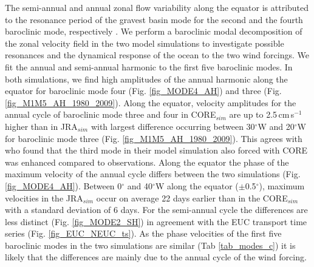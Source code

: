 \documentclass[os, manuscript]{copernicus}
\begin{document}
	The semi-annual and annual zonal flow variability along the equator is attributed to the resonance period of the gravest basin mode for the second and the fourth baroclinic mode, respectively \citep{Brandt2016}. We perform a baroclinic modal decomposition of the zonal velocity field in the two model simulations to investigate possible resonances and the dynamical response of the ocean to the two wind forcings. We fit the annual and semi-annual harmonic to the first five baroclinic modes. In both simulations, we find high amplitudes of the annual harmonic along the equator for baroclinic mode four (Fig. \ref{fig_MODE4_AH}) and three (Fig. \ref{fig_M1M5_AH_1980_2009}). Along the equator, velocity amplitudes for the annual cycle of baroclinic mode three and four in CORE$_{sim}$ are up to 2.5$\,$cm$\,$s$^{-1}$ higher than in JRA$_{sim}$ with largest difference occurring between 30$^{\circ}$W and 20$^{\circ}$W for baroclinic mode three (Fig. \ref{fig_M1M5_AH_1980_2009}). This agrees with \cite{Brandt2016} who found that the third mode in their model simulation also forced with CORE was enhanced compared to observations. 
	Along the equator the phase of the maximum velocity of the annual cycle differs between the two simulations (Fig. \ref{fig_MODE4_AH}). Between 0$^{\circ}$ and 40$^{\circ}$W along the equator ($ \pm $0.5$^{\circ}$), maximum velocities in the JRA$_{sim}$ occur on average 22 days earlier than in the CORE$_{sim}$ with a standard deviation of 6 days. For the semi-annual cycle the differences are less distinct (Fig. \ref{fig_MODE2_SH}) in agreement with the EUC transport time series (Fig. \ref{fig_EUC_NEUC_ts}). As the phase velocities of the first five baroclinic modes in the two simulations are similar (Tab \ref{tab_modes_c}) it is likely that the differences are mainly due to the annual cycle of the wind forcing.
	
\end{document}
